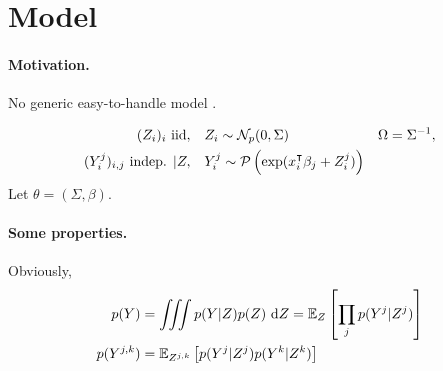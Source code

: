 \section{Model}

\paragraph{Motivation.} No generic easy-to-handle model \cite{IYA17}.

\begin{align*}
 (Z_i)_i \text{ iid}, & \quad Z_i \sim \mathcal{N}_p(0, \Sigma) & \Omega = \Sigma^{-1}, \\
 (Y_i^j)_{i, j} \text{ indep. } | Z, & \quad Y_i^j \sim \mathcal{P}\left(\exp(x_i^\intercal \beta_j + Z_i^j)\right) 
\end{align*}
Let $\theta = (\Sigma, \beta)$.

\paragraph{Some properties.} 
Obviously,
\begin{align*}
 p(Y) 
 & = \iiint p(Y | Z) p(Z) \d Z  = \Esp_Z \left[\prod_j p(Y^j | Z^j) \right] \\
 p(Y^{j, k}) 
 & = \Esp_{Z^{j, k}} \left[ p(Y^j|Z^j) p(Y^k|Z^k) \right]
\end{align*}
